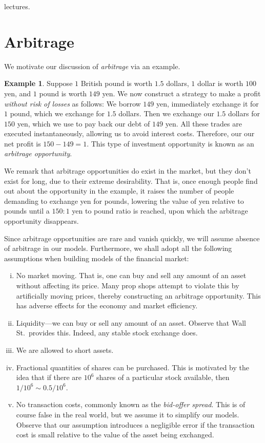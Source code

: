 \documentclass[12pt]{article}
\theoremstyle{plain}
\theoremstyle{definition}
\newtheorem*{example}{Example}
\theoremstyle{remark}
\numberwithin{equation}{section}  %
\begin{document}
lectures.\section{Arbitrage}
We motivate our discussion of \emph{arbitrage} via an example. 
\begin{example}
	Suppose $1$ British pound is worth $1.5$ dollars,  $1$ dollar is worth 
	$100$ yen, 
	and $1$ pound is worth $149$ yen.
	We now construct a strategy to make a profit \emph{without risk of losses} 
	as follows: 
	We borrow $149$ yen, immediately exchange it for $1$ pound, which we 
	exchange for $1.5$ dollars. Then we exchange our $1.5$ dollars for $150$ 
	yen, which we use to pay back our debt of $149$ yen. All these trades are 
	executed instantaneously, allowing us to avoid interest costs. Therefore, 
	our 
	our net profit is $150 - 149 = 1$. This type of investment opportunity is 
	known as an
	\emph{arbitrage opportunity}.
\end{example}
We remark that arbitrage opportunities do exist in the market, but they don't 
exist for long, due to their extreme desirability. That is, once enough people 
find out about the opportunity in the example, it raises the number of people 
demanding to exchange yen for pounds, lowering the value of yen relative to 
pounds until a $150:1$ yen to pound ratio is reached, upon which the arbitrage 
opportunity disappears.  

Since arbitrage opportunities are rare and vanish quickly, we will assume 
absence of arbitrage in our models. Furthermore, we shall adopt all the 
following
assumptions when building models of the financial market:

\begin{enumerate}[(i)]
	\item No market moving. That is, one can buy and sell any amount of an asset
		without affecting its price. Many prop shops attempt to violate this by 
		artificially moving prices, thereby constructing an arbitrage 
		opportunity. This has adverse effects for the economy and market 
		efficiency.   
	\item Liquidity---we can buy or sell any amount of an asset. Observe that 
		Wall St.\  provides this. Indeed, any stable stock exchange does. 
	\item We are allowed to short assets.
	\item Fractional quantities of shares can be purchased. This is motivated 
		by the idea that if there are $10^{6}$ shares of a particular stock 
		available, then $1/10^6 \sim 0.5/10^{6}$.
	\item No transaction costs, commonly known as the \emph{bid-offer spread}. 
		This is of course false in the real world, but we assume it to simplify our 
		models. Observe that our assumption introduces a negligible error if the 
		transaction cost is small relative to the value of the asset being 
		exchanged.
\end{enumerate}
\end{document}
